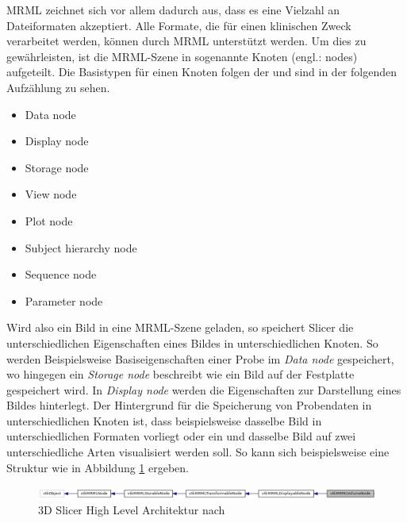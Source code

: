 \ac{MRML} zeichnet sich vor allem dadurch aus, dass es eine Vielzahl an Dateiformaten
akzeptiert. Alle Formate, die für einen klinischen Zweck verarbeitet werden,
können durch \ac{MRML} unterstützt werden. Um dies zu gewährleisten, ist die \ac{MRML}-Szene
in sogenannte Knoten (engl.: nodes) aufgeteilt. Die Basistypen für einen Knoten folgen
der \citet{slicer2024} und sind in der folgenden Aufzählung zu sehen.

\begin{minipage}{0.45\textwidth}
	\begin{itemize}
		\item Data node

		\item Display node

		\item Storage node

		\item View node
	\end{itemize}
\end{minipage}
\hfill
\begin{minipage}{0.45\textwidth}
	\begin{itemize}
		\item Plot node

		\item Subject hierarchy node

		\item Sequence node

		\item Parameter node
	\end{itemize}
\end{minipage}

Wird also ein Bild in eine \ac{MRML}-Szene geladen, so speichert Slicer die unterschiedlichen
Eigenschaften eines Bildes in unterschiedlichen Knoten. So werden Beispielsweise
Basiseigenschaften einer Probe im \textit{Data node} gespeichert, wo hingegen
ein \textit{Storage node} beschreibt wie ein Bild auf der Festplatte gespeichert
wird. In \textit{Display node} werden die Eigenschaften zur Darstellung eines Bildes
hinterlegt. Der Hintergrund für die Speicherung von Probendaten in
unterschiedlichen Knoten ist, dass beispielsweise dasselbe Bild in unterschiedlichen
Formaten vorliegt oder ein und dasselbe Bild auf zwei unterschiedliche Arten visualisiert
werden soll. So kann sich beispielsweise eine Struktur wie in Abbildung
\ref{fig:3d_slicer_class} ergeben.

\begin{figure}[h]
	\centering
	\includegraphics[width=1\textwidth]{img/slicer_class_index.jpg}
	\caption{3D Slicer High Level Architektur nach \citet{slicer2024}}
	\label{fig:3d_slicer_class}
\end{figure}

